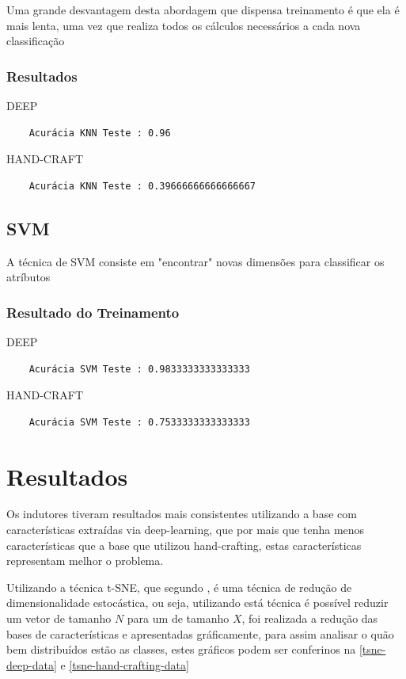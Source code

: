 \documentclass[
article,			%
11pt,				%
oneside,			%
a4paper,			%
english,			%
brazil,				%
sumario=tradicional,
]{abntex2}
\begin{document}
	Uma grande desvantagem desta abordagem que dispensa treinamento é que ela é mais lenta, uma vez que realiza todos os cálculos necessários a cada nova classificação
	
	\subsubsection{Resultados}
	
	DEEP	
	\begin{verbatim}
	Acurácia KNN Teste : 0.96
	\end{verbatim}
	
	HAND-CRAFT
	\begin{verbatim}
	Acurácia KNN Teste : 0.39666666666666667
	\end{verbatim}
	
	
	\subsection{SVM}
	A técnica de SVM consiste em "encontrar" novas dimensões para classificar os atríbutos
	\subsubsection{Resultado do Treinamento}
		
	DEEP	
	\begin{verbatim}
	Acurácia SVM Teste : 0.9833333333333333
	\end{verbatim}
	
	HAND-CRAFT
	\begin{verbatim}
	Acurácia SVM Teste : 0.7533333333333333
	\end{verbatim}
	
	
	\section{Resultados}
	
	Os indutores tiveram resultados mais consistentes utilizando a base com características extraídas via deep-learning, que por mais que tenha menos características que a base que utilizou hand-crafting, estas características representam melhor o problema.
	
	Utilizando a técnica t-SNE, que segundo , é uma técnica de redução de dimensionalidade estocástica, ou seja, utilizando está técnica é possível reduzir um vetor de tamanho \(N\) para um de tamanho \(X\), foi realizada a redução das bases de características e apresentadas gráficamente, para assim analisar o quão bem distribuídos estão as classes, estes gráficos podem ser conferinos na \autoref{tsne-deep-data} e \autoref{tsne-hand-crafting-data}
	
\end{document}
